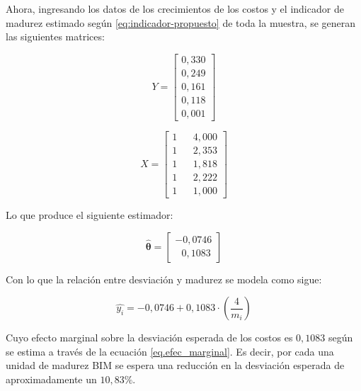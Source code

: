 Ahora, ingresando los datos de los crecimientos de los costos y el indicador de madurez estimado según \eqref{eq:indicador-propuesto} de toda la muestra, se generan las siguientes matrices:

\begin{minipage}{.45\linewidth}
    \begin{equation*}
    Y = 
        \begin{bmatrix}
            0,330 \\
            0,249 \\
            0,161 \\
            0,118 \\
            0,001 
        \end{bmatrix}
    \end{equation*}
\end{minipage}
\begin{minipage}{.45\linewidth}
    \begin{equation*}
    X = 
        \begin{bmatrix}
            1 & & 4,000 \\
            1 & & 2,353 \\
            1 & & 1,818 \\
            1 & & 2,222 \\
            1 & & 1,000
        \end{bmatrix}
    \end{equation*}
\end{minipage}

Lo que produce el siguiente estimador:

\begin{equation}
    \hat{\bm{\theta}} = 
        \begin{bmatrix}
            -0,0746 \\
            ~~~0,1083
        \end{bmatrix}
\end{equation}

Con lo que la relación entre desviación y madurez se modela como sigue:

\begin{equation}
    \label{eq.modelo-prop-todos}
    \hat{y_i} = -0,0746 + 0,1083\cdot \left( \frac{4}{m_i} \right)
\end{equation}

Cuyo efecto marginal sobre la desviación esperada de los costos es $0,1083$ según se estima a través de la ecuación \eqref{eq.efec_marginal}. Es decir, por cada una unidad de madurez BIM se espera una reducción en la desviación esperada de aproximadamente un $10,83\%$.

